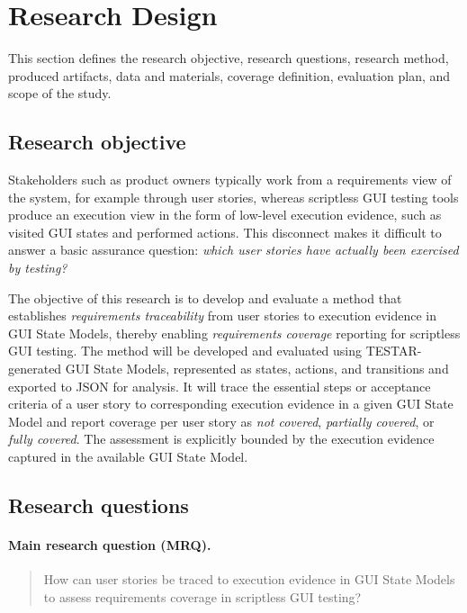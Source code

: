 \section{Research Design}
\label{sec:research-design}

This section defines the research objective, research questions, research method, produced artifacts, data and materials, coverage definition, evaluation plan, and scope of the study.

\subsection{Research objective}
\label{subsec:research-objective}

Stakeholders such as product owners typically work from a requirements view of the system, for example through user stories, whereas scriptless GUI testing tools produce an execution view in the form of low-level execution evidence, such as visited GUI states and performed actions. This disconnect makes it difficult to answer a basic assurance question: \emph{which user stories have actually been exercised by testing?}

The objective of this research is to develop and evaluate a method that establishes \emph{requirements traceability} from user stories to execution evidence in GUI State Models, thereby enabling \emph{requirements coverage} reporting for scriptless GUI testing. The method will be developed and evaluated using TESTAR-generated GUI State Models, represented as states, actions, and transitions and exported to JSON for analysis. It will trace the essential steps or acceptance criteria of a user story to corresponding execution evidence in a given GUI State Model and report coverage per user story as \emph{not covered}, \emph{partially covered}, or \emph{fully covered}. The assessment is explicitly bounded by the execution evidence captured in the available GUI State Model.

\subsection{Research questions}
\label{subsec:research-questions}

\paragraph{Main research question (MRQ).}
\begin{quote}
How can user stories be traced to execution evidence in GUI State Models to assess requirements coverage in scriptless GUI testing?
\end{quote}

